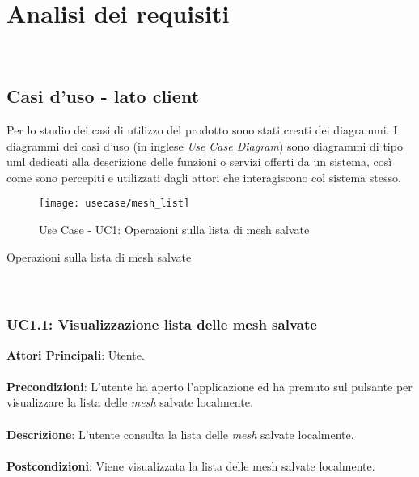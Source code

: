 
\chapter{Analisi dei requisiti}
\label{cap:analisi-requisiti}

\intro{}\\

\section{Casi d'uso - lato client}

Per lo studio dei casi di utilizzo del prodotto sono stati creati dei diagrammi.
I diagrammi dei casi d'uso (in inglese \emph{Use Case Diagram}) sono diagrammi di tipo \gls{uml} dedicati alla descrizione delle funzioni o servizi offerti da un sistema, così come sono percepiti e utilizzati dagli attori che interagiscono col sistema stesso.

\begin{figure}[!h] 
    \centering 
    \texttt{[image: usecase/mesh\_list]} 
    \caption{Use Case - UC1: Operazioni sulla lista di mesh salvate}
\end{figure}

\begin{usecase}{1}{Operazioni sulla lista di mesh salvate}
\\ 
\\ 
\\ 
\label{uc:lista-mesh}
\end{usecase}

\subsection{UC1.1: Visualizzazione lista delle mesh salvate}
\textbf{Attori Principali}: Utente.
\\\\ \textbf{Precondizioni}: L'utente ha aperto l'applicazione ed ha premuto sul pulsante per visualizzare la lista delle \emph{mesh} salvate localmente.
\\\\ \textbf{Descrizione}:  L'utente consulta la lista delle \emph{mesh} salvate localmente.
\\\\ \textbf{Postcondizioni}: Viene visualizzata la lista delle mesh salvate localmente.

